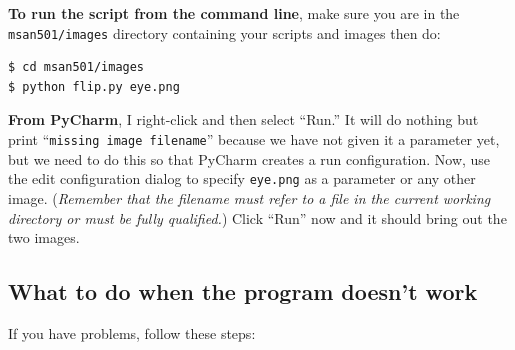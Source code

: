 {\bf To run the script from the command line}, make sure you are in the {\tt msan501/images} directory containing your scripts and images then do:

\begin{lstlisting}[style=BashInputStyle]
$ cd msan501/images
$ python flip.py eye.png
\end{lstlisting}

{\bf From PyCharm}, I right-click and then select ``Run.'' It will do nothing but print ``{\tt missing image filename}'' because we have not given it a parameter yet, but we need to do this so that PyCharm creates a run configuration. Now, use the edit configuration dialog to specify {\tt eye.png} as a parameter or any other image. ({\em Remember that the filename must refer to a file in the current working directory or must be fully qualified.}) Click ``Run'' now and it should bring out the two images.


\subsection{What to do when the program doesn't work}

If you have problems, follow these steps:

